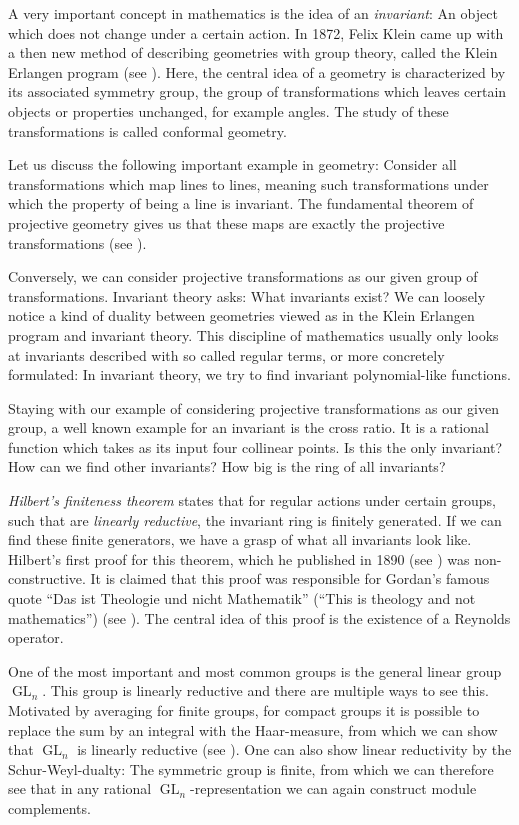 A very important concept in mathematics is the idea of an \textit{invariant}:
An object which does not change under a certain action.
In 1872, Felix Klein came up with a then new method of describing geometries with group theory, called the Klein Erlangen program (see \cite{Kle93}).
Here, the central idea of a geometry is characterized by its associated symmetry group, the group of transformations which leaves certain objects or properties unchanged, for example angles.
The study of these transformations is called conformal geometry.

Let us discuss the following important example in geometry:
Consider all transformations which map lines to lines, meaning such transformations under which the property of being a line is invariant.
The fundamental theorem of projective geometry gives us that these maps are exactly the projective transformations (see \cite[Ex V.44,~Ex I.51]{Aud03}).

Conversely, we can consider projective transformations as our given group of transformations.
Invariant theory asks: What invariants exist?
We can loosely notice a kind of duality between geometries viewed as in the Klein Erlangen program and invariant theory.
This discipline of mathematics usually only looks at invariants described with so called regular terms, or more concretely formulated:  In invariant theory, we try to find invariant polynomial-like functions.

Staying with our example of considering projective transformations as our given group, a well known example for an invariant is the cross ratio.
It is a rational function which takes as its input four collinear points.
Is this the only invariant?
How can we find other invariants?
How big is the ring of all invariants?

\textit{Hilbert's finiteness theorem} states that for regular actions under certain groups, such that are \textit{linearly reductive}, the invariant ring is finitely generated.
If we can find these finite generators, we have a grasp of what all invariants look like.
Hilbert's first proof for this theorem, which he published in 1890 (see \cite{Hil90}) was non-constructive.
It is claimed that this proof was responsible for Gordan's famous quote ``Das ist Theologie und nicht Mathematik'' (``This is theology and not mathematics'') (see \cite[p.42]{DK15}).
The central idea of this proof is the existence of a Reynolds operator.

One of the most important and most common groups is the general linear group $\operatorname{GL}_n$.
This group is linearly reductive and there are multiple ways to see this.
Motivated by averaging for finite groups, for compact groups it is possible to replace the sum by an integral with the Haar-measure, from which we can show that $\operatorname{GL}_n$ is linearly reductive (see \cite[p.~285-288]{Kra85}).
One can also show linear reductivity by the Schur-Weyl-dualty:  The symmetric group is finite, from which we can therefore see that in any rational $\operatorname{GL}_n$-representation we can again construct module complements.

